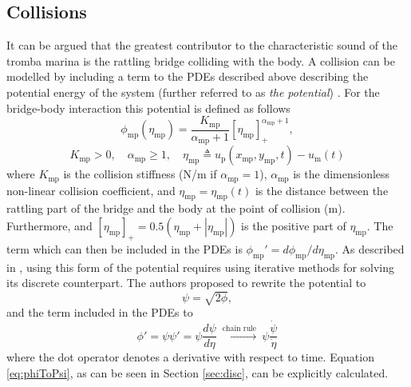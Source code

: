 \documentclass[dvipsnames, pdftex]{article}
\def\SWcomment[#1]{\textcolor{Bittersweet}{#1}}
\def\MDcomment[#1]{\textcolor{Blue}{#1}}
\begin{document}
\subsection{Collisions}
It can be argued that the greatest contributor to the characteristic sound of the tromba marina is the rattling bridge colliding with the body. A collision can be modelled by including a term to the PDEs described above describing the potential energy of the system (further referred to as \textit{the potential}) \cite{Ducceschi2019}. For the bridge-body interaction this potential is defined as follows %
\begin{equation}\label{eq:potential}
    \phi_\text{mp}(\eta_\text{mp}) = \frac{K_\text{mp}}{\alpha_\text{mp}+1}[\eta_\text{mp}]_+^{\alpha_\text{mp}+1},
\end{equation}
\begin{equation*}
    K_\text{mp}>0, \quad \alpha_\text{mp}\geq 1, \quad \eta_\text{mp}\triangleq u_\text{p}(x_\text{mp},y_\text{mp},t) - u_\text{m}(t)
\end{equation*}
where $K_\text{mp}$ is the collision stiffness (N/m if $\alpha_\text{mp} = 1$), $\alpha_\text{mp}$ is the dimensionless non-linear collision coefficient, and $\eta_\text{mp} = \eta_\text{mp}(t)$ is the distance between the rattling part of the bridge and the body at the point of collision (m). Furthermore, and $[\eta_\text{mp}]_+ = 0.5(\eta_\text{mp}+|\eta_\text{mp}|)$ is the positive part of $\eta_\text{mp}$. The term which can then be included in the PDEs is $\phi_\text{mp}' = d\phi_\text{mp}/d\eta_\text{mp}$. As described in \cite{Falaize2016a:SMC2020, Falaize2016b:SMC2020, Lopes:SMC2020, Ducceschi2019}, using this form of the potential requires using iterative methods for solving its discrete counterpart. The authors proposed to rewrite the potential to
\begin{equation}
    \psi = \sqrt{2\phi},
\end{equation}
and the term included in the PDEs to
\begin{equation}\label{eq:phiToPsi}
    \phi' = \psi\psi' = \psi\frac{d\psi}{d\eta}\  \xrightarrow{\text{chain rule}}\ \psi\frac{\dot \psi}{\dot \eta}
\end{equation}
where the dot operator denotes a derivative with respect to time. Equation \eqref{eq:phiToPsi}, as can be seen in Section \ref{sec:disc}, can be explicitly calculated. 
\end{document}
